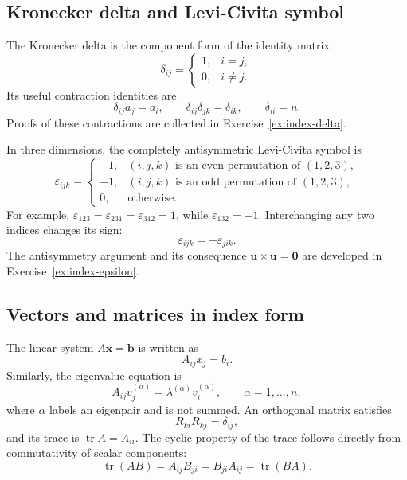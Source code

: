 \subsection{Kronecker delta and Levi-Civita symbol}
The Kronecker delta is the component form of the identity matrix:
\begin{equation}
\delta_{ij}=\begin{cases}
1, & i=j,\\
0, & i\ne j.
\end{cases}
\end{equation}
Its useful contraction identities are
\begin{equation}
\delta_{ij}a_j=a_i,
\qquad
\delta_{ij}\delta_{jk}=\delta_{ik},
\qquad
\delta_{ii}=n.
\end{equation}
Proofs of these contractions are collected in Exercise~\ref{ex:index-delta}.

In three dimensions, the completely antisymmetric Levi-Civita symbol is
\begin{equation}
\varepsilon_{ijk}=\begin{cases}
+1, & (i,j,k)\text{ is an even permutation of }(1,2,3),\\
-1, & (i,j,k)\text{ is an odd permutation of }(1,2,3),\\
0, & \text{otherwise}.
\end{cases}
\end{equation}
For example, $\varepsilon_{123}=\varepsilon_{231}=\varepsilon_{312}=1$, while $\varepsilon_{132}=-1$. Interchanging any two indices changes its sign:
\begin{equation}
\varepsilon_{ijk}=-\varepsilon_{jik}.
\end{equation}
The antisymmetry argument and its consequence $\mathbf{u}\times\mathbf{u}=\mathbf{0}$ are developed in Exercise~\ref{ex:index-epsilon}.

\subsection{Vectors and matrices in index form}
The linear system $A\mathbf{x}=\mathbf{b}$ is written as
\begin{equation}
A_{ij}x_j=b_i.
\end{equation}
Similarly, the eigenvalue equation is
\begin{equation}
A_{ij}v_j^{(\alpha)}=\lambda^{(\alpha)}v_i^{(\alpha)},
\qquad \alpha=1,\ldots,n,
\end{equation}
where $\alpha$ labels an eigenpair and is not summed. An orthogonal matrix satisfies
\begin{equation}
R_{ki}R_{kj}=\delta_{ij},
\end{equation}
and its trace is $\operatorname{tr}A=A_{ii}$. The cyclic property of the trace follows directly from commutativity of scalar components:
\begin{equation}
\operatorname{tr}(AB)=A_{ij}B_{ji}=B_{ji}A_{ij}=\operatorname{tr}(BA).
\end{equation}

